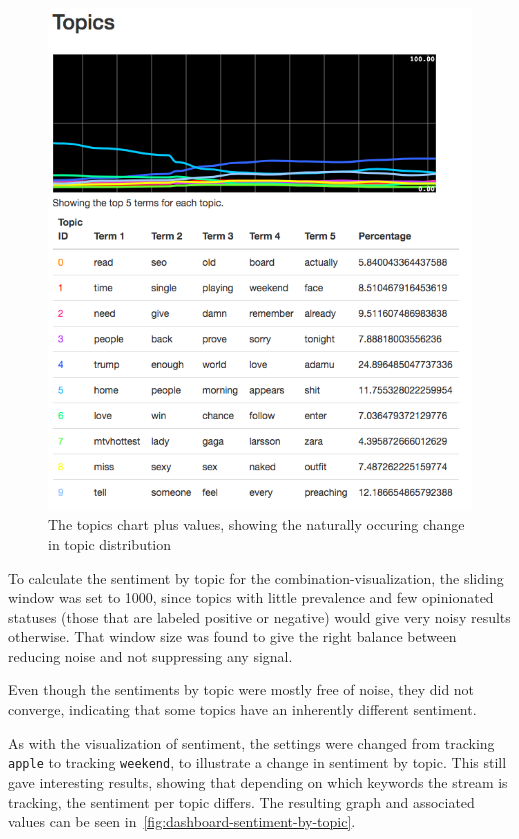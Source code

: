 \begin{figure}
    \centering
    \caption{The topics chart plus values, showing the naturally occuring change in topic distribution}
    \label{fig:dashboard-topics}
    \includegraphics[width=\textwidth]{../images/dashboard_topics.png}
\end{figure}

\par
To calculate the sentiment by topic for the combination-visualization,
the sliding window was set to 1000, since topics with little prevalence and few opinionated statuses
(those that are labeled positive or negative) would give very noisy results otherwise.
That window size was found to give the right balance between reducing noise and not suppressing any signal.
\par
Even though the sentiments by topic were mostly free of noise, they did not converge,
indicating that some topics have an inherently different sentiment.
\par
As with the visualization of sentiment,
the settings were changed from tracking \texttt{apple} to tracking \texttt{weekend}, to illustrate a change in sentiment by topic.
This still gave interesting results, showing that depending on which keywords the stream is tracking,
the sentiment per topic differs.
The resulting graph and associated values can be seen in~\autoref{fig:dashboard-sentiment-by-topic}.

